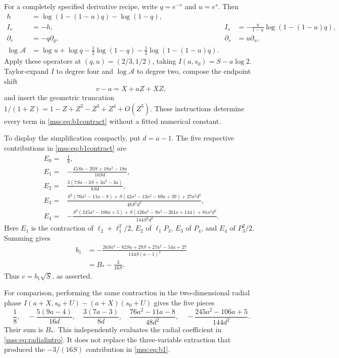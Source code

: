 \documentclass[11pt,letterpaper]{article}
\numberwithin{equation}{section}
\theoremstyle{definition}\newtheorem{definition}[theorem]{Definition}
\theoremstyle{remark}\newtheorem{remark}[theorem]{Remark}
\begin{document}
For a completely specified derivative recipe, write $q=e^{-v}$ and $u=e^s$. Then
\begin{align}\label{mss:eq:derivativerecipe}
h&=\log(1-(1-u)q)-\log(1-q),\\
I_v&=-h,&I_s&=-\frac{u}{1-u}\log(1-(1-u)q),\nonumber\\
\partial_v&=-q\partial_q,&\partial_s&=u\partial_u,\nonumber\\
\log\mathcal A&=\log u+\log q
-\tfrac12\log(1-q)-\tfrac12\log(1-(1-u)q).\nonumber
\end{align}
Apply these operators at $(q,u)=(2/3,1/2)$, taking
$I(a,s_0)=S-a\log2$. Taylor-expand $I$ to degree four and $\log\mathcal A$ to degree two, compose the endpoint shift
\begin{equation}\label{mss:eq:endpointshift}
v-a=X+aZ+XZ,
\end{equation}
and insert the geometric truncation $1/(1+Z)=1-Z+Z^2-Z^3+Z^4+O(Z^5)$. These instructions determine every term in \eqref{mss:eq:b1contract} without a fitted numerical constant.

To display the simplification compactly, put $d=a-1$. The five respective contributions in \eqref{mss:eq:b1contract} are
\begin{align}\label{mss:eq:pieces}
E_0={}&\frac18,\\
E_1={}&-\frac{45Sa-20S+18a^2-18a}{16Sd},\nonumber\\
E_2={}&\frac{3(7Sa-3S+3a^2-3a)}{8Sd},\nonumber\\
E_3={}&\frac{S^2(76a^2-11a-8)+S(42a^3-12a^2-69a+39)
+27a^2d^2}{48S^2d^2},\nonumber\\
E_4={}&-\frac{S^2(245a^2-106a+5)+S(126a^3-9a^2-261a+144)
+81a^2d^2}{144S^2d^2}.\nonumber
\end{align}
Here $E_1$ is the contraction of $\ell_2+\ell_1^2/2$, $E_2$ of $\ell_1P_3$, $E_3$ of $P_4$, and $E_4$ of $P_3^2/2$. Summing gives
\begin{align}\label{mss:eq:b1}
b_1&=-\frac{26Sa^2-82Sa+29S+27a^2-54a+27}{144S(a-1)^2}\\
&=B_*-\frac3{16S}.\nonumber
\end{align}
Thus $c=b_1\sqrt S$, as asserted.

For comparison, performing the same contraction in the two-dimensional radial phase $I(a+X,s_0+U)-(a+X)(s_0+U)$ gives the five pieces
\begin{equation}\label{mss:eq:radialpieces}
\frac18,\quad
-\frac{5(9a-4)}{16d},\quad
\frac{3(7a-3)}{8d},\quad
\frac{76a^2-11a-8}{48d^2},\quad
-\frac{245a^2-106a+5}{144d^2}.
\end{equation}
Their sum is $B_*$. This independently evaluates the radial coefficient in \eqref{mss:eq:radialintro}. It does not replace the three-variable extraction that produced the $-3/(16S)$ contribution in \eqref{mss:eq:b1}.
\end{document}
